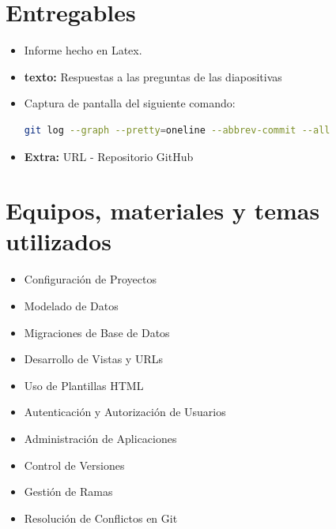 \documentclass{article}
\begin{document}
 
  \section{Entregables}
  \begin{itemize}
    \item Informe hecho en Latex.
    \item \textbf{texto: }Respuestas a las preguntas de las diapositivas 
    \item Captura de pantalla del siguiente comando:
    \begin{lstlisting}[language=bash]
      git log --graph --pretty=oneline --abbrev-commit --all
    \end{lstlisting}
    \item \textbf{Extra: }URL - Repositorio GitHub
  \end{itemize}
  
		
	\section{Equipos, materiales y temas utilizados}
  \begin{itemize}
    \item Configuración de Proyectos
    \item Modelado de Datos
    \item Migraciones de Base de Datos
    \item Desarrollo de Vistas y URLs
    \item Uso de Plantillas HTML
    \item Autenticación y Autorización de Usuarios
    \item Administración de Aplicaciones
    \item Control de Versiones
    \item Gestión de Ramas
    \item Resolución de Conflictos en Git
  \end{itemize}

\end{document}

